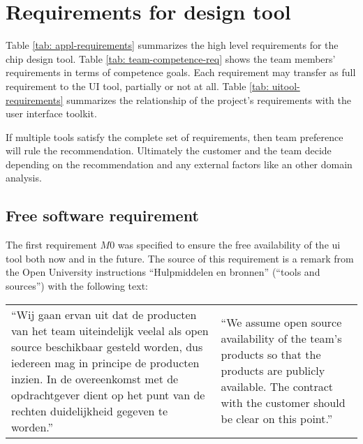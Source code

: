 \section{Requirements for design tool}

Table \ref{tab: appl-requirements} summarizes the high level requirements for
the chip design tool. Table \ref{tab: team-competence-req} shows the team
members' requirements in terms of competence goals. Each requirement may
transfer as full requirement to the UI tool, partially or not at all. Table
\ref{tab: uitool-requirements} summarizes the relationship of the project's
requirements with the user interface toolkit.

If multiple tools satisfy the complete set of requirements, then
team preference will rule the recommendation. Ultimately the customer
and the team decide depending on the recommendation and any external factors
like an other domain analysis.

\subsection{Free software requirement}

The first requirement $M0$ was specified to ensure the free availability of the
ui tool both now and in the future. The source of
this requirement is a remark from the Open University instructions
``Hulpmiddelen en bronnen'' (``tools and sources'') with the following text:

\vspace{1em}

\begin{tabular}[t]{ll}
\begin{minipage}{.45\textwidth}

	``Wij gaan ervan uit dat de producten van het team uiteindelijk veelal als
	open source beschikbaar gesteld worden, dus iedereen mag in principe de
	producten inzien. In de overeenkomst met de opdrachtgever dient op het punt
	van de rechten duidelijkheid gegeven te worden.''

\end{minipage}

&

\begin{minipage}{.45\textwidth}

	``We assume open source availability of the team's products so that the
	products are publicly available. The contract with the customer should be
	clear on this point.''

\end{minipage}

\end{tabular}

